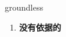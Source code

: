 
\begin{frame}
{\huge groundless}
\begin{center}
\begin{enumerate}\Large
  \item \textbf{没有依据的}
\end{enumerate}
\end{center}
\end{frame}

